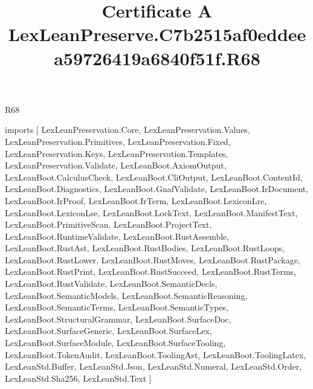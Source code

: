 \begin{lexlean}{R68}
\title{Certificate A LexLeanPreserve.C7b2515af0eddeea59726419a6840f51f.R68}
\begin{coremodule}
imports [
  LexLeanPreservation.Core,
  LexLeanPreservation.Values,
  LexLeanPreservation.Primitives,
  LexLeanPreservation.Fixed,
  LexLeanPreservation.Keys,
  LexLeanPreservation.Templates,
  LexLeanPreservation.Validate,
  LexLeanBoot.AxiomOutput,
  LexLeanBoot.CalculusCheck,
  LexLeanBoot.CliOutput,
  LexLeanBoot.ContentId,
  LexLeanBoot.Diagnostics,
  LexLeanBoot.GnafValidate,
  LexLeanBoot.IrDocument,
  LexLeanBoot.IrProof,
  LexLeanBoot.IrTerm,
  LexLeanBoot.LexiconLre,
  LexLeanBoot.LexiconLse,
  LexLeanBoot.LockText,
  LexLeanBoot.ManifestText,
  LexLeanBoot.PrimitiveScan,
  LexLeanBoot.ProjectText,
  LexLeanBoot.RuntimeValidate,
  LexLeanBoot.RustAssemble,
  LexLeanBoot.RustAst,
  LexLeanBoot.RustBodies,
  LexLeanBoot.RustLoops,
  LexLeanBoot.RustLower,
  LexLeanBoot.RustMoves,
  LexLeanBoot.RustPackage,
  LexLeanBoot.RustPrint,
  LexLeanBoot.RustSucceed,
  LexLeanBoot.RustTerms,
  LexLeanBoot.RustValidate,
  LexLeanBoot.SemanticDecls,
  LexLeanBoot.SemanticModels,
  LexLeanBoot.SemanticReasoning,
  LexLeanBoot.SemanticTerms,
  LexLeanBoot.SemanticTypes,
  LexLeanBoot.StructuralGrammar,
  LexLeanBoot.SurfaceDoc,
  LexLeanBoot.SurfaceGeneric,
  LexLeanBoot.SurfaceLex,
  LexLeanBoot.SurfaceModule,
  LexLeanBoot.SurfaceTooling,
  LexLeanBoot.TokenAudit,
  LexLeanBoot.ToolingAst,
  LexLeanBoot.ToolingLatex,
  LexLeanStd.Buffer,
  LexLeanStd.Json,
  LexLeanStd.Numeral,
  LexLeanStd.Order,
  LexLeanStd.Sha256,
  LexLeanStd.Text
]


\end{coremodule}
\end{lexlean}
